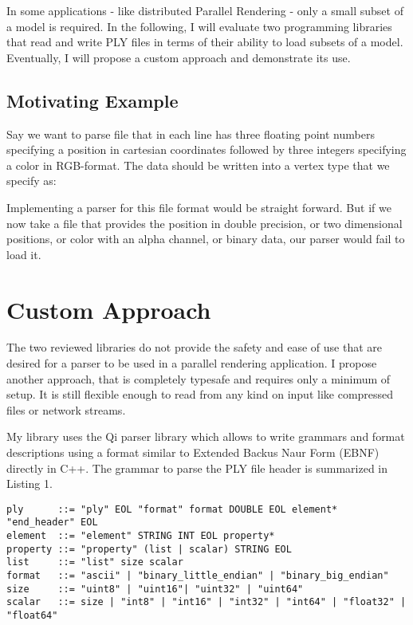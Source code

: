 \documentclass[a4paper,parskip=half,twocolumn]{scrartcl}
\begin{document}
In some applications - like distributed Parallel Rendering - only a small subset
of a model is required. In the following, I will evaluate two programming
libraries that read and write PLY files in terms of their ability to load
subsets of a model. Eventually, I will propose a custom approach and demonstrate
its use.

\subsection{Motivating Example}

Say we want to parse file that in each line has three floating point
numbers specifying a position in cartesian coordinates followed by three
integers specifying a color in RGB-format. The data should be written into a
vertex type that we specify as:


Implementing a parser for this file format would be straight forward. But if we
now take a file that provides the position in double precision, or two
dimensional positions, or color with an alpha channel, or binary data, our
parser would fail to load it.




\section{Custom Approach}

The two reviewed libraries do not provide the safety and ease of use that are
desired for a parser to be used in a parallel rendering application. I propose
another approach, that is completely typesafe and requires only a minimum of
setup. It is still flexible enough to read from any kind on input like
compressed files or network streams.

My library uses the Qi parser library which allows to write grammars and format
descriptions using a format similar to Extended Backus Naur Form (EBNF) directly
in C++. The grammar to parse the PLY file header is summarized in Listing 1.

\begin{lstlisting}[float=*,frame=tb,caption=EBNF Grammar of the PLY file header]
ply      ::= "ply" EOL "format" format DOUBLE EOL element* "end_header" EOL
element  ::= "element" STRING INT EOL property*
property ::= "property" (list | scalar) STRING EOL
list     ::= "list" size scalar
format   ::= "ascii" | "binary_little_endian" | "binary_big_endian"
size     ::= "uint8" | "uint16"| "uint32" | "uint64"
scalar   ::= size | "int8" | "int16" | "int32" | "int64" | "float32" | "float64"
\end{lstlisting}
\end{document}
